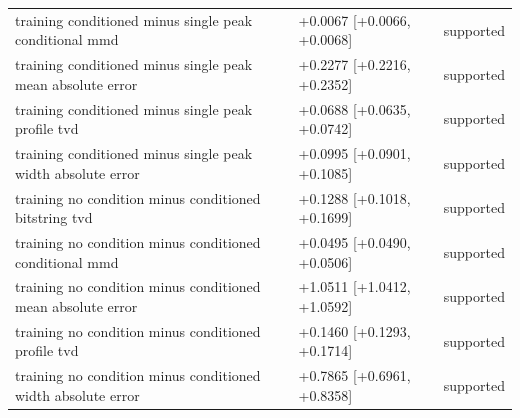 \begin{table}[p]
\begin{tabular}{@{}p{}p{}p{}@{}}
training conditioned minus single peak conditional mmd & +0.0067 [+0.0066, +0.0068] & supported \\
training conditioned minus single peak mean absolute error & +0.2277 [+0.2216, +0.2352] & supported \\
training conditioned minus single peak profile tvd & +0.0688 [+0.0635, +0.0742] & supported \\
training conditioned minus single peak width absolute error & +0.0995 [+0.0901, +0.1085] & supported \\
training no condition minus conditioned bitstring tvd & +0.1288 [+0.1018, +0.1699] & supported \\
training no condition minus conditioned conditional mmd & +0.0495 [+0.0490, +0.0506] & supported \\
training no condition minus conditioned mean absolute error & +1.0511 [+1.0412, +1.0592] & supported \\
training no condition minus conditioned profile tvd & +0.1460 [+0.1293, +0.1714] & supported \\
training no condition minus conditioned width absolute error & +0.7865 [+0.6961, +0.8358] & supported \\
\bottomrule
\end{tabular}
\end{table}
\clearpage
